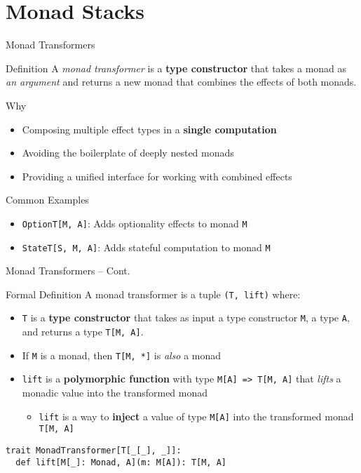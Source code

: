 \documentclass[presentation, 10pt]{beamer}\mode<presentation>{\usetheme{metropolis}}
\begin{document}
\section{Monad Stacks}
\begin{frame}{Monad Transformers}
\begin{exampleblock}{Definition}
A \emph{monad transformer} is a \textbf{type constructor} that takes a monad as \emph{an argument} and returns a new monad that combines the effects of both monads.
\end{exampleblock}
\begin{alertblock}{Why}
	\begin{itemize}
		\item Composing multiple effect types in a \textbf{single computation}
		\item Avoiding the boilerplate of deeply nested monads
		\item Providing a unified interface for working with combined effects
	\end{itemize}
\end{alertblock}
\begin{exampleblock}{Common Examples}
	\begin{itemize}
		\item \texttt{OptionT[M, A]}: Adds optionality effects to monad \texttt{M}
		\item \texttt{StateT[S, M, A]}: Adds stateful computation to monad \texttt{M}
	\end{itemize}
\end{exampleblock}
\end{frame}
\begin{frame}[fragile]{Monad Transformers -- Cont.}
\begin{alertblock}{Formal Definition}
	A monad transformer is a tuple \texttt{(T, lift)} where:
		\begin{itemize}
			\item \texttt{T} is a \textbf{type constructor} that takes as input a type constructor \texttt{M}, a type \texttt{A}, and returns a type \texttt{T[M, A]}.
			\item If \texttt{M} is a monad, then \texttt{T[M, *]} is \emph{also} a monad
			\item \texttt{lift} is a \textbf{polymorphic function} with type \texttt{M[A] => T[M, A]} that \emph{lifts} a monadic value into the transformed monad
			\begin{itemize}
				\item \texttt{lift} is a way to \textbf{inject} a value of type \texttt{M[A]} into the transformed monad \texttt{T[M, A]}
			\end{itemize}
		\end{itemize}
\end{alertblock}
\begin{tcolorbox}
\begin{verbatim}
trait MonadTransformer[T[_[_], _]]:
  def lift[M[_]: Monad, A](m: M[A]): T[M, A]
\end{verbatim}
\end{tcolorbox}
\end{frame}
\end{document}
